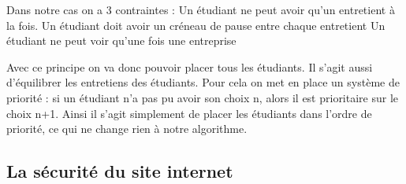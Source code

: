 \documentclass[12pt,a4paper]{article}
\begin{document}
\begin{large}
\begin{onehalfspace}
Dans notre cas on a 3 contraintes :
Un étudiant ne peut avoir qu’un entretient à la fois.
Un étudiant doit avoir un créneau de pause entre chaque entretient
Un étudiant ne peut voir qu’une fois une entreprise

    Avec ce principe on va donc pouvoir placer tous les étudiants. Il s’agit aussi d’équilibrer les entretiens des étudiants. Pour cela on met en place un système de priorité : si un étudiant n’a pas pu avoir son choix n, alors il est prioritaire sur le choix n+1. Ainsi il s’agit simplement de placer les étudiants dans l’ordre de priorité, ce qui ne change rien à notre algorithme.
\end{onehalfspace}
\end{large}

\subsection{La sécurité du site internet}
\end{document}
